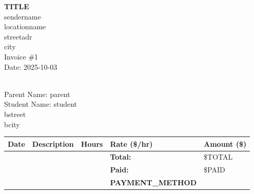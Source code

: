 \documentclass[11pt]{article}
\begin{document}
\pagestyle{empty}

\begin{center}
  {\LARGE\bf {{TITLE}}} \\
  {\large sendername} \\
  \vspace{0.5em}
  {\large locationname} \\
  {\large streetadr} \\
  {\large city} \\
  \vspace{2em}
  {\large Invoice \#1} \\
  {Date: 2025-10-03}
\end{center}

\vspace{1em}

 \\
Parent Name: parent \\
Student Name: student \\
bstreet \\
bcity \\

\vspace{1em}

\vspace{1em}

\renewcommand{\arraystretch}{1.2}
\begin{longtable}{@{} p{3cm} p{6cm} p{2cm} p{2cm} p{2cm} @{} }
  \toprule
  \textbf{Date} & \textbf{Description} & \textbf{Hours} & \textbf{Rate (\$/hr)} & \textbf{Amount (\$)} \\
  \midrule
  \midrule
  & & & \textbf{Total:} & \${{TOTAL}} \\
  & & & \textbf{Paid:} & \${{PAID}} \\
  & & & \textbf{{PAYMENT_METHOD}} & \\
  \bottomrule
\end{longtable}

\vfill
\end{document}
